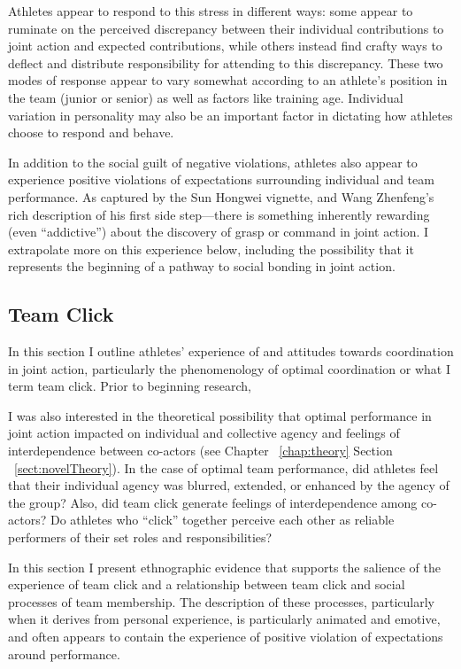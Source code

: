\begin{CJK}{UTF8}{gbsn}
Athletes appear to respond to this stress in different ways: some appear to ruminate on the perceived discrepancy between their individual contributions to joint action and expected contributions, while others instead find crafty ways to deflect and distribute responsibility for attending to this discrepancy.  These two modes of response appear to vary somewhat according to an athlete's position in the team (junior or senior) as well as factors like training age.  Individual variation in personality may also be an important factor in dictating how athletes choose to respond and behave.

In addition to the social guilt of negative violations, athletes also appear to experience positive violations of expectations surrounding individual and team performance.  As captured by the Sun Hongwei vignette, and Wang Zhenfeng's rich description of his first side step---there is something inherently rewarding (even ``addictive'') about the discovery of grasp or command in joint action.  I extrapolate more on this experience below, including the possibility that it represents the beginning of a pathway to social bonding in joint action.



\clearpage
\subsection{Team Click\label{sect:teamClick}}
In this section I outline athletes' experience of and attitudes towards coordination in joint action, particularly the phenomenology of optimal coordination or what I term team click.  Prior to beginning research,

I was also interested in the theoretical possibility that optimal performance in joint action impacted on individual and collective agency and feelings of interdependence between co-actors (see Chapter ~\ref{chap:theory} Section ~\ref{sect:novelTheory}).  In the case of optimal team performance, did athletes feel that their individual agency was blurred, extended, or enhanced by the agency of the group?  Also, did team click generate feelings of interdependence among co-actors?  Do athletes who ``click'' together perceive each other as reliable performers of their set roles and responsibilities?

In this section I present ethnographic evidence that supports the salience of the experience of team click and a relationship between team click and social processes of team membership.  The description of these processes, particularly when it derives from personal experience, is particularly animated and emotive, and often appears to contain the experience of positive violation of expectations around performance.


\end{CJK}
